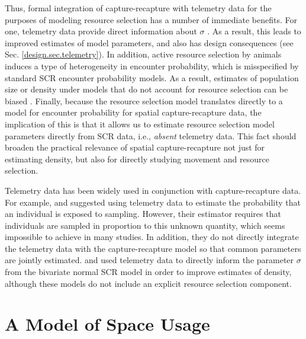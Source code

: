 Thus, formal integration of
capture-recapture with telemetry data for the purposes of modeling
resource selection has a number of immediate benefits. For one,
telemetry data provide direct information about $\sigma$
\citep{sollmann_etal:2012ecol,sollmann_etal:inprepjapplecol}. As a
result, this leads to improved estimates of model parameters, and also
has design consequences (see Sec. \ref{design.sec.telemetry}).  In
addition, active resource selection by animals induces a type of
heterogeneity in encounter probability, which is misspecified by
standard SCR encounter probability models. As a result, estimates of
population size or density under models that do not account for
resource selection can be biased \citep{royle_etal:2012mee}.  Finally,
because the resource selection model translates directly to a model
for encounter probability for spatial capture-recapture data, the
implication of this is that it allows us to estimate resource
selection model parameters directly from SCR data, i.e., {\it absent}
telemetry data. This fact should broaden the practical relevance of
spatial capture-recapture not just for estimating density,
but also for directly studying movement and resource selection.


Telemetry data has been widely used in conjunction with
capture-recapture data.  For example, \citet{white_shenk:2001} and
\citet{ivan:2012} suggested using telemetry data to estimate the
probability that an individual is exposed to sampling. However, their
estimator requires that individuals are sampled in proportion to this
unknown quantity, which seems impossible to achieve in many
studies. In addition, they do not directly integrate the telemetry
data with the capture-recapture model so that common parameters are
jointly estimated.  \citet{sollmann_etal:inprepjapplecol} and
\citet{sollmann_etal:2012ecol} used telemetry data to directly inform
the parameter $\sigma$ from the bivariate normal SCR model in order to
improve estimates of density, although these models do not include an
explicit resource selection component.






\section{A Model of Space Usage}
\label{rsf.sec.rsfmodel}


